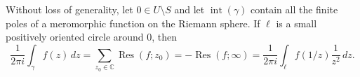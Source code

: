 \documentclass[11pt,a4paper]{article}
\begin{document}
Without loss of generality, let $0\in U\setminus S$ and let $\operatorname{int}(\gamma)$ contain all the finite poles of a meromorphic function on the Riemann sphere. If $\ell$ is a small positively oriented circle around $0$, then
\[
  \frac{1}{2\pi i}\int_\gamma f(z)\,dz
  =\sum_{z_0\in\mathbb C}\operatorname{Res}(f;z_0)
  =-\operatorname{Res}(f;\infty)
  =\frac{1}{2\pi i}\int_\ell f(1/z)\frac{1}{z^2}\,dz.
\]

\end{document}
